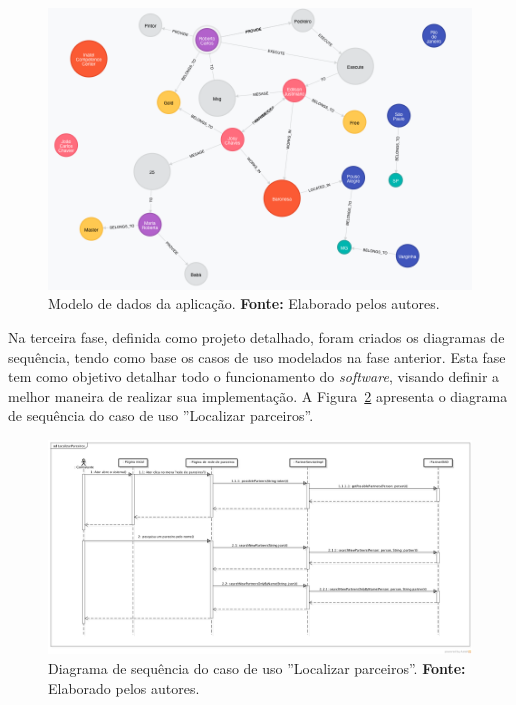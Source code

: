 \begin{figure}[h!]
	\centerline{\includegraphics[scale=0.4]{./imagens/structure-all-nodes.png}}
	\caption[Modelo de dados da aplicação]
	{Modelo de dados da aplicação. \textbf{Fonte:} Elaborado pelos autores.}
	\label{fig:modelo_dados_aplicacao}
\end{figure} 

\par Na terceira fase, definida como projeto detalhado, foram criados os diagramas de sequência, tendo como base os casos de uso modelados na fase anterior. Esta fase tem como objetivo detalhar todo o funcionamento do \textit{software}, visando definir a melhor maneira de realizar sua implementação. A Figura~\ref{fig:diagrama_sequencia_localizar_parceiros} apresenta o diagrama de sequência do caso de uso ''Localizar parceiros''.

\newpage
\begin{figure}[h!]
	\centerline{\includegraphics[angle=90,scale=0.4]{./imagens/diagrama-sequencia-localizar-novos-parceiros.jpg}}
	\caption[Diagrama de sequência do caso de uso ''Localizar parceiros'']
	{Diagrama de sequência do caso de uso ''Localizar parceiros''. \textbf{Fonte:} Elaborado pelos autores.}
	\label{fig:diagrama_sequencia_localizar_parceiros}
\end{figure}

